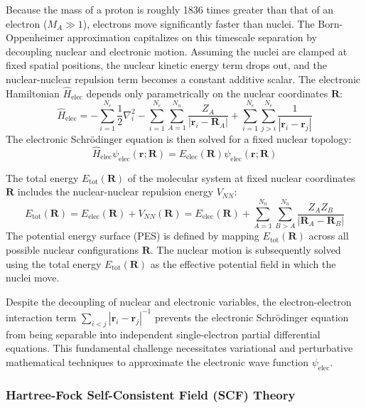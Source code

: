 \documentclass[12pt]{article}
\begin{document}
Because the mass of a proton is roughly 1836 times greater than that of an electron ($M_A \gg 1$), electrons move significantly faster than nuclei. The Born-Oppenheimer approximation capitalizes on this timescale separation by decoupling nuclear and electronic motion. Assuming the nuclei are clamped at fixed spatial positions, the nuclear kinetic energy term drops out, and the nuclear-nuclear repulsion term becomes a constant additive scalar. The electronic Hamiltonian $\hat{H}_{\text{elec}}$ depends only parametrically on the nuclear coordinates $\mathbf{R}$:
\begin{equation}
\hat{H}_{\text{elec}} = -\sum_{i=1}^{N_e} \frac{1}{2} \nabla_i^2 - \sum_{i=1}^{N_e} \sum_{A=1}^{N_n} \frac{Z_A}{|\mathbf{r}_i - \mathbf{R}_A|} + \sum_{i=1}^{N_e} \sum_{j>i}^{N_e} \frac{1}{|\mathbf{r}_i - \mathbf{r}_j|}
\end{equation}
The electronic Schrödinger equation is then solved for a fixed nuclear topology:
\begin{equation}
\hat{H}_{\text{elec}} \psi_{\text{elec}}(\mathbf{r}; \mathbf{R}) = E_{\text{elec}}(\mathbf{R}) \psi_{\text{elec}}(\mathbf{r}; \mathbf{R})
\end{equation}

The total energy $E_{\text{tot}}(\mathbf{R})$ of the molecular system at fixed nuclear coordinates $\mathbf{R}$ includes the nuclear-nuclear repulsion energy $V_{NN}$:
\begin{equation}
E_{\text{tot}}(\mathbf{R}) = E_{\text{elec}}(\mathbf{R}) + V_{NN}(\mathbf{R}) = E_{\text{elec}}(\mathbf{R}) + \sum_{A=1}^{N_n} \sum_{B>A}^{N_n} \frac{Z_A Z_B}{|\mathbf{R}_A - \mathbf{R}_B|}
\end{equation}
The potential energy surface (PES) is defined by mapping $E_{\text{tot}}(\mathbf{R})$ across all possible nuclear configurations $\mathbf{R}$. The nuclear motion is subsequently solved using the total energy $E_{\text{tot}}(\mathbf{R})$ as the effective potential field in which the nuclei move.

Despite the decoupling of nuclear and electronic variables, the electron-electron interaction term $\sum_{i<j} |\mathbf{r}_i - \mathbf{r}_j|^{-1}$ prevents the electronic Schrödinger equation from being separable into independent single-electron partial differential equations. This fundamental challenge necessitates variational and perturbative mathematical techniques to approximate the electronic wave function $\psi_{\text{elec}}$.

\subsubsection{Hartree-Fock Self-Consistent Field (SCF) Theory}
\end{document}
